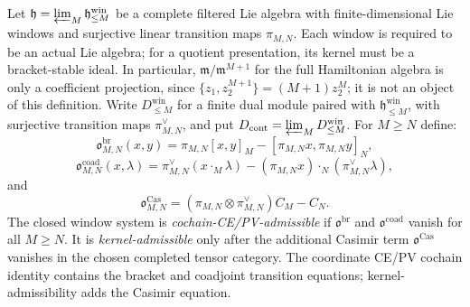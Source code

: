 \begin{defn}
\label{defn:closed-window-obstruction-terms}
  Let \(\mathfrak h=\varprojlim_M\mathfrak h^{\mathrm{win}}_{\leq M}\) be a complete
  filtered Lie algebra with finite-dimensional Lie windows and surjective
  linear transition maps \(\pi_{M,N}\).  Each window is required to be
  an actual Lie algebra; for a quotient presentation, its kernel must be
  a bracket-stable ideal.  In particular,
  \(\mathfrak m/\mathfrak m^{M+1}\) for the full Hamiltonian algebra is
  only a coefficient projection, since
  \(\{z_1,z_2^{M+1}\}=(M+1)z_2^M\); it is not an object of this
  definition.  Write
  \(D^{\mathrm{win}}_{\leq M}\) for a finite dual module paired with
  \(\mathfrak h^{\mathrm{win}}_{\leq M}\), with surjective transition maps
  \(\pi^\vee_{M,N}\), and put
  \(D_{\mathrm{cont}}=\varprojlim_MD^{\mathrm{win}}_{\leq M}\).  For \(M\geq N\)
  define:
  \[
    \mathfrak o^{\mathrm{br}}_{M,N}(x,y)
      =\pi_{M,N}[x,y]_M-[\pi_{M,N}x,\pi_{M,N}y]_N,
  \]
  \[
    \mathfrak o^{\mathrm{coad}}_{M,N}(x,\lambda)
      =\pi^\vee_{M,N}(x\cdot_M\lambda)
       -(\pi_{M,N}x)\cdot_N(\pi^\vee_{M,N}\lambda),
  \]
  and
  \[
    \mathfrak o^{\mathrm{Cas}}_{M,N}
      =(\pi_{M,N}\otimes\pi^\vee_{M,N})C_M-C_N .
  \]
  The closed window system is \emph{cochain-CE/PV-admissible} if
  \(\mathfrak o^{\mathrm{br}}\) and \(\mathfrak o^{\mathrm{coad}}\)
  vanish for all \(M\geq N\).  It is
  \emph{kernel-admissible} only after the additional Casimir term
  \(\mathfrak o^{\mathrm{Cas}}\) vanishes in the chosen completed tensor
  category.  The coordinate CE/PV cochain identity contains the bracket
  and coadjoint transition equations; kernel-admissibility adds the
  Casimir equation.
\end{defn}

